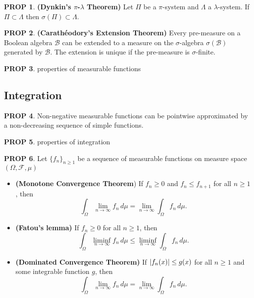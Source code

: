 \documentclass[hidelinks,11pt]{article}
\theoremstyle{definition}
\theoremstyle{dotless}
\newtheorem{prop}{PROP}[section]
\theoremstyle{remark}
\DeclareMathOperator{\1}{\mathbf{1}}
\begin{document}
\begin{prop}\label{Dynkin’sπ-λTheorem}\textup{\textbf{(Dynkin's $\pi$-$\lambda$ Theorem)}} Let $\Pi$ be a $\pi$-system and $\Lambda$ a $\lambda$-system. If $\Pi\subset\Lambda$ then $\sigma(\Pi)\subset\Lambda$.
\end{prop}

\begin{prop}\textup{\textbf{(Carathéodory's Extension Theorem)}} Every pre-measure on a Boolean algebra $\mathcal{B}$ can be extended to a measure on the $\sigma$-algebra $\sigma(\mathcal{B})$ generated by $\mathcal{B}$. The extension is unique if the pre-measure is $\sigma$-finite.
\end{prop}

\begin{prop}
properties of measurable functions
\end{prop}

\subsection{Integration}

\begin{prop}
Non-negative measurable functions can be pointwise approximated by a non-decreasing sequence of simple functions.
\end{prop}

\begin{prop}
properties of integration
\end{prop}

\begin{prop}
Let $\{f_n\}_{n\geq1}$ be a sequence of measurable functions on measure space $(\Omega,\mathcal{F},\mu)$
\begin{itemize}
    \item \textup{\textbf{(Monotone Convergence Theorem})} If $f_n\geq0$ and $f_n\leq f_{n+1}$ for all $n\geq1$, then \[\int_\Omega\lim_{n\to\infty}f_n\,d\mu=\lim_{n\to\infty}\int_\Omega f_n\,d\mu.\]
    \item \textup{\textbf{(Fatou's lemma)}} If $f_n\geq0$ for all $n\geq1$, then
    \[\int_\Omega\liminf_{n\to\infty}{f_n}\,d\mu\leq\liminf_{n\to\infty}\int_\Omega f_n\,d\mu.\]
    \item \textup{\textbf{(Dominated Convergence Theorem)}}\label{Dominated Convergence Theorem} If $\abs{f_n(x)}\leq g(x)$ for all $n\geq1$ and some integrable function $g$, then
    \[\int_\Omega\lim_{n\to\infty}f_n\,d\mu=\lim_{n\to\infty}\int_\Omega f_n\,d\mu.\]
\end{itemize}
\end{prop}
\end{document}
